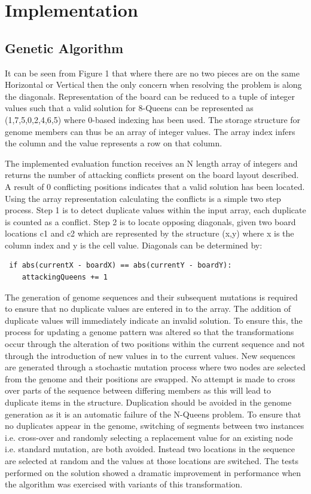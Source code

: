 \documentclass[a4paper,onecolumn,11pt]{article}
\begin{document}
\section{Implementation}
\subsection{Genetic Algorithm}
It can be seen from Figure 1 that where there are no two pieces are on the same Horizontal or Vertical then the only concern when resolving the problem is along the diagonals. Representation of the board can be reduced to a tuple of integer values such that a valid solution for 8-Queens can be represented as (1,7,5,0,2,4,6,5) where 0-based indexing has been used. The storage structure for genome members can thus be an array of integer values. The array index infers the column and the value represents a row on that column.

The implemented evaluation function receives an N length array of integers and returns the number of attacking conflicts present on the board layout described. A result of 0 conflicting positions indicates that a valid solution has been located. Using the array representation calculating the conflicts is a simple two step process. Step 1 is to detect duplicate values within the input array, each duplicate is counted as a conflict. Step 2 is to locate opposing diagonals, given two board locations c1 and c2 which are represented by the structure (x,y) where x is the column index and y is the cell value. Diagonals can be determined by: 
\begin{lstlisting}
 if abs(currentX - boardX) == abs(currentY - boardY):
	attackingQueens += 1
\end{lstlisting}

The generation of genome sequences and their subsequent mutations is required to ensure that no duplicate values are entered in to the array. The addition of duplicate values will immediately indicate an invalid solution. To ensure this, the process for updating a genome pattern was altered so that the transformations occur through the alteration of two positions within the current sequence and not through the introduction of new values in to the current values. New sequences are generated through a stochastic mutation process where two nodes are selected from the genome and their positions are swapped. No attempt is made to cross over parts of the sequence between differing members as this will lead to duplicate items in the structure. Duplication should be avoided in the genome generation as it is an automatic failure of the N-Queens problem. To ensure that no duplicates appear in the genome, switching of segments between two instances i.e. cross-over and randomly selecting a replacement value for an existing node i.e. standard mutation, are both avoided. Instead two locations in the sequence are selected at random and the values at those locations are switched. The tests performed on the solution showed a dramatic improvement in performance when the algorithm was exercised with variants of this transformation.
\end{document}

